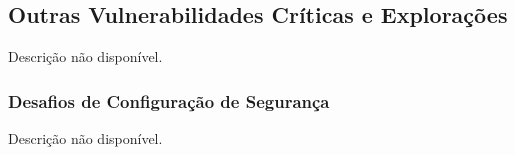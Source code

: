\documentclass[a4paper,12pt]{article}
\begin{document}
\subsection{Outras Vulnerabilidades Críticas e Explorações}
Descrição não disponível.

\subsubsection{Desafios de Configuração de Segurança}
Descrição não disponível.
\end{document}
